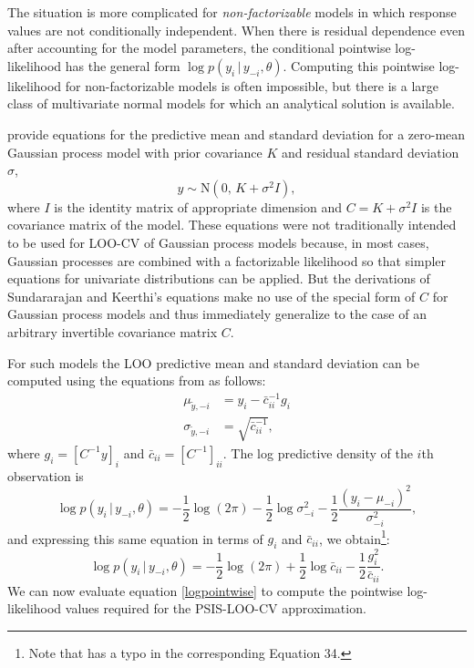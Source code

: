 \documentclass[11pt]{article}
\begin{document}
The situation is more complicated for \emph{non-factorizable} models in which
response values are not conditionally independent. When there is residual
dependence even after accounting for the model parameters, the conditional
pointwise log-likelihood has the general form $\log p(y_i \,|\, y_{-i},
\theta)$. Computing this pointwise log-likelihood for non-factorizable models is 
often impossible, but there is a large class of multivariate normal models for which 
an analytical solution is available.

\cite{sundararajan2001} provide equations for the predictive mean and standard
deviation for a zero-mean Gaussian process model with prior covariance $K$ and
residual standard deviation $\sigma$,
%
\begin{equation}
y \sim {\mathrm N}(0, \, K+\sigma^2 I),
\end{equation}
%
where $I$ is the identity matrix of appropriate dimension and $C = K+\sigma^2 I$
is the covariance matrix of the model. These equations were not traditionally
intended to be used for LOO-CV of Gaussian process models because, in most
cases, Gaussian processes are combined with a factorizable likelihood so that
simpler equations for univariate distributions can be applied. But the
derivations of Sundararajan and Keerthi's equations make no use of the special
form of $C$ for Gaussian process models and thus immediately generalize to the
case of an arbitrary invertible covariance matrix $C$.

For such models the LOO predictive mean and standard deviation can be computed
using the equations from \cite{sundararajan2001} as follows:
%
\begin{align}
\label{ypredpars}
  \mu_{\tilde{y},-i} &= y_i-\bar{c}_{ii}^{-1} g_i \nonumber \\
  \sigma_{\tilde{y},-i} &= \sqrt{\bar{c}_{ii}^{-1}},
\end{align}
%
where $g_i = \left[C^{-1} y\right]_i$ and
$\bar{c}_{ii} = \left[C^{-1}\right]_{ii}$.
The log predictive density of the $i$th observation is
%
\begin{equation}
  \log p(y_i \,|\, y_{-i},\theta)
  = - \frac{1}{2}\log(2\pi)
  - \frac{1}{2}\log \sigma^2_{-i}
  - \frac{1}{2}\frac{(y_i-\mu_{-i})^2}{\sigma^2_{-i}},
\end{equation}
%
and expressing this same equation in terms of $g_i$ and $\bar{c}_{ii}$, we
obtain\footnote{ Note that \cite{vehtari2016} has a typo in the corresponding
Equation 34.}:
%
\begin{equation}
\label{logpointwise}
  \log p(y_i \,|\, y_{-i},\theta)
  = - \frac{1}{2}\log(2\pi)
  + \frac{1}{2}\log \bar{c}_{ii}
  - \frac{1}{2}\frac{g_i^2}{\bar{c}_{ii}}.
\end{equation}
%
We can now evaluate equation \eqref{logpointwise} to compute the pointwise
log-likelihood values required for the PSIS-LOO-CV approximation.
\end{document}
